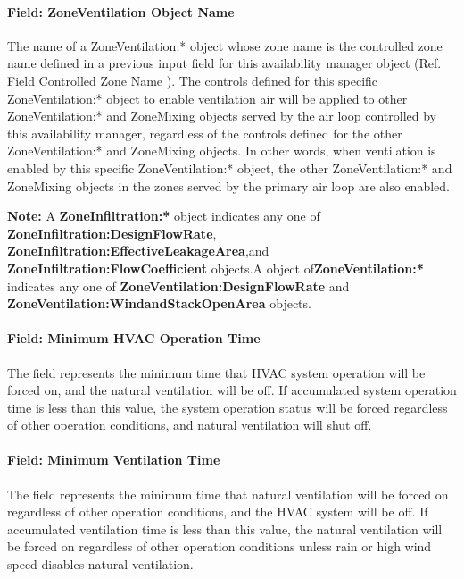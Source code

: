 \paragraph{Field: ZoneVentilation Object Name}\label{field-zoneventilation-object-name}

The name of a ZoneVentilation:* object whose zone name is the controlled zone name defined in a previous input field for this availability manager object (Ref. Field Controlled Zone Name ). The controls defined for this specific ZoneVentilation:* object to enable ventilation air will be applied to other ZoneVentilation:* and ZoneMixing objects served by the air loop controlled by this availability manager, regardless of the controls defined for the other ZoneVentilation:* and ZoneMixing objects. In other words, when ventilation is enabled by this specific ZoneVentilation:* object, the other ZoneVentilation:* and ZoneMixing objects in the zones served by the primary air loop are also enabled.

\textbf{Note:} A \textbf{ZoneInfiltration:*} object indicates any one of \textbf{ZoneInfiltration:DesignFlowRate}, \textbf{ZoneInfiltration:EffectiveLeakageArea},and \textbf{ZoneInfiltration:FlowCoefficient} objects.A object of\textbf{ZoneVentilation:*} indicates any one of \textbf{ZoneVentilation:DesignFlowRate} and \textbf{ZoneVentilation:WindandStackOpenArea} objects.

\paragraph{Field: Minimum HVAC Operation Time}\label{field-minimum-hvac-operation-time}

 The field represents the minimum time that HVAC system operation will be forced on, and the natural ventilation will be off. If accumulated system operation time is less than this value, the system operation status will be forced regardless of other operation conditions, and natural ventilation will shut off. 

\paragraph{Field: Minimum Ventilation Time}\label{field-minimum-ventilation-time}

 The field represents the minimum time that natural ventilation will be forced on regardless of other operation conditions, and the HVAC system will be off. If accumulated ventilation time is less than this value, the natural ventilation will be forced on regardless of other operation conditions unless rain or high wind speed disables natural ventilation.


